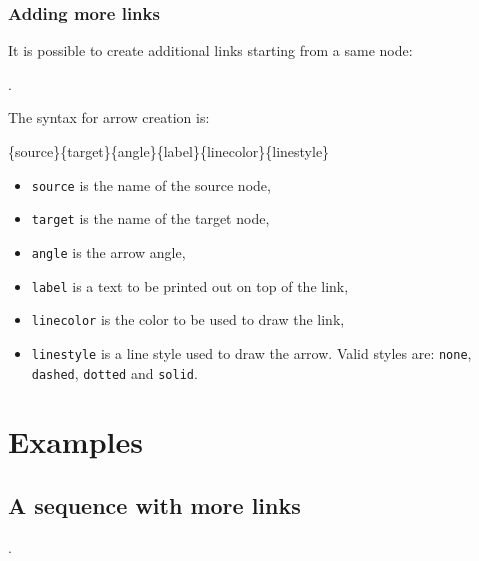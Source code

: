 \subsubsection{Adding more links}
It is possible to create additional links starting from a same node:
\begin{codeexample}[width=6cm]
.
 \end{codeexample}
The syntax for arrow creation is:
\begin{command}{\arrow\{source\}\{target\}\{angle\}\{label\}\{linecolor\}\{linestyle\}}
\begin{itemize}
\item \verb|source| is the name of the source node,
\item \verb|target| is the name of the target node,
\item \verb|angle| is the arrow angle,
\item \verb|label| is a text to be printed out on top of the link,
\item \verb|linecolor| is the color to be used to draw the link,
\item \verb|linestyle| is a line style used to draw the arrow. Valid styles are: \verb|none|, \verb|dashed|, \verb|dotted| and \verb|solid|.
\end{itemize}
\end{command}



\section{Examples}

\subsection{A sequence with more links}
\begin{codeexample}[width=7cm]
.
\end{codeexample}


